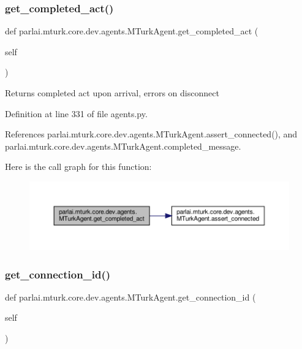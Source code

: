 \subsubsection{\texorpdfstring{get\+\_\+completed\+\_\+act()}{get\_completed\_act()}}
{\footnotesize\ttfamily def parlai.\+mturk.\+core.\+dev.\+agents.\+M\+Turk\+Agent.\+get\+\_\+completed\+\_\+act (\begin{DoxyParamCaption}\item[{}]{self }\end{DoxyParamCaption})}

\begin{DoxyVerb}Returns completed act upon arrival, errors on disconnect\end{DoxyVerb}
 

Definition at line 331 of file agents.\+py.



References parlai.\+mturk.\+core.\+dev.\+agents.\+M\+Turk\+Agent.\+assert\+\_\+connected(), and parlai.\+mturk.\+core.\+dev.\+agents.\+M\+Turk\+Agent.\+completed\+\_\+message.

Here is the call graph for this function\+:
\nopagebreak
\begin{figure}[H]
\begin{center}
\leavevmode
\includegraphics[width=350pt]{classparlai_1_1mturk_1_1core_1_1dev_1_1agents_1_1MTurkAgent_a81c9e542c8ee09cf424c172f3fd00af2_cgraph}
\end{center}
\end{figure}
\mbox{\label{classparlai_1_1mturk_1_1core_1_1dev_1_1agents_1_1MTurkAgent_abba4a01586ccd7b85e31175cf5c9f487}} 
\subsubsection{\texorpdfstring{get\+\_\+connection\+\_\+id()}{get\_connection\_id()}}
{\footnotesize\ttfamily def parlai.\+mturk.\+core.\+dev.\+agents.\+M\+Turk\+Agent.\+get\+\_\+connection\+\_\+id (\begin{DoxyParamCaption}\item[{}]{self }\end{DoxyParamCaption})}

